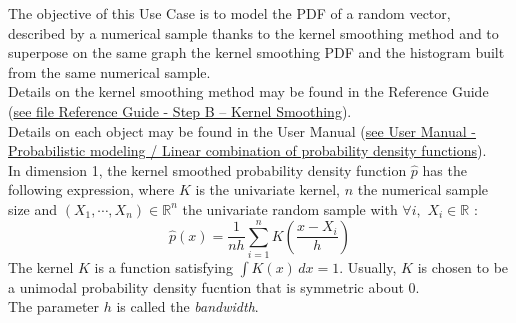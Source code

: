 \renewcommand{\filename}{docUC_InputWithData_KernelSmoothing.tex}
\renewcommand{\filetitle}{UC : PDF fitting by kernel smoothing and graphical validation : superposition of the empirical and kernel smoothing CDF}

\HeaderIIILevel



The objective of this Use Case is to model the PDF of a random  vector, described by a numerical sample thanks to the kernel smoothing method and to superpose on the same graph the kernel smoothing PDF and the histogram built from the same numerical sample.\\



Details on the kernel smoothing method may be found in the Reference Guide (\href{OpenTURNS_ReferenceGuide.pdf}{see file Reference Guide - Step B -- Kernel Smoothing}).\\

Details on each object may be found in the User Manual  (\href{OpenTURNS_UserManual_TUI.pdf}{see User Manual - Probabilistic modeling / Linear combination of probability density functions}).\\

In dimension 1, the kernel smoothed probability density function $\hat{p}$ has the following expression, where $K$ is the univariate kernel, $n$ the numerical sample size and $(X_1, \cdots, X_n) \in \mathbb{R}^n$ the univariate random sample with $\forall i, \, \, X_i \in \mathbb{R}$ :
\begin{equation}
  \label{kernelSmooth}
  \hat{p}(x) = \displaystyle \frac{1}{nh}\sum_{i=1}^{n} K\left(\frac{x-X_i}{h}\right)
\end{equation}
The kernel $K$ is a function satisfying $\int K(x)\, dx=1$. Usually, $K$ is chosen to be a unimodal probability density fucntion that is symmetric about 0.\\
The parameter $h$ is called the \emph{bandwidth}.\\


